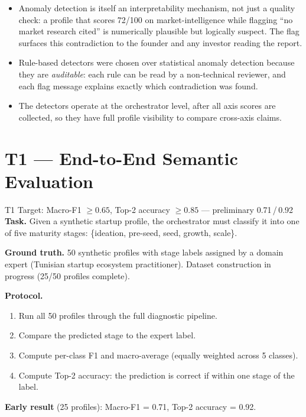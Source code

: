 \documentclass[11pt,a4paper]{article}
\begin{document}
\begin{itemize}
  \item Anomaly detection is itself an interpretability mechanism, not just a quality
        check: a profile that scores 72/100 on market-intelligence while flagging
        ``no market research cited'' is numerically plausible but logically suspect.
        The flag surfaces this contradiction to the founder and any investor reading the report.
  \item Rule-based detectors were chosen over statistical anomaly detection because they
        are \emph{auditable}: each rule can be read by a non-technical reviewer, and each
        flag message explains exactly which contradiction was found.
  \item The detectors operate at the orchestrator level, after all axis scores are collected,
        so they have full profile visibility to compare cross-axis claims.
\end{itemize}

\section{T1 — End-to-End Semantic Evaluation}

\begin{pendingbox}{T1 Target: Macro-F1 $\geq 0.65$, Top-2 accuracy $\geq 0.85$
— preliminary 0.71\,/\,0.92}
\textbf{Task.}
Given a synthetic startup profile, the orchestrator must classify it into one of five
maturity stages: \{ideation, pre-seed, seed, growth, scale\}.

\textbf{Ground truth.}
50 synthetic profiles with stage labels assigned by a domain expert (Tunisian startup
ecosystem practitioner).
Dataset construction in progress (25/50 profiles complete).

\textbf{Protocol.}
\begin{enumerate}
  \item Run all 50 profiles through the full diagnostic pipeline.
  \item Compare the predicted stage to the expert label.
  \item Compute per-class F1 and macro-average (equally weighted across 5 classes).
  \item Compute Top-2 accuracy: the prediction is correct if within one stage of the label.
\end{enumerate}

\textbf{Early result} (25 profiles): Macro-F1 = 0.71, Top-2 accuracy = 0.92.
\end{pendingbox}
\end{document}
